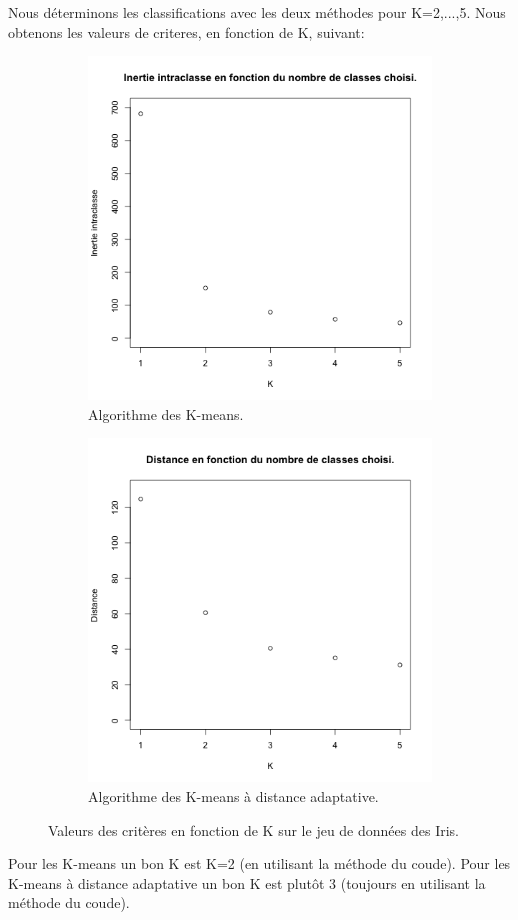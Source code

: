 \documentclass[a4paper,11pt,oneside,roman]{article}
\begin{document}
    Nous déterminons les classifications avec les deux méthodes pour K=2,...,5. 
    Nous obtenons les valeurs de criteres, en fonction de K, suivant:
    \begin{figure}
        \centering
        \begin{subfigure}{.5\textwidth}
          \centering
          \includegraphics[width=.8\linewidth]{imgs/K_means_Iris_critere.png}
          \caption{Algorithme des K-means.}
        \end{subfigure}%
        \begin{subfigure}{.5\textwidth}
          \centering
          \includegraphics[width=.8\linewidth]{imgs/K_means_adapt_Iris_critere.png}
          \caption{Algorithme des K-means à distance adaptative.}
        \end{subfigure}
        \caption{Valeurs des critères en fonction de K sur le jeu de données des Iris.}
        \label{fig_synth_3}
    \end{figure}

    Pour les K-means un bon K est K=2 (en utilisant la méthode du coude).
    Pour les K-means à distance adaptative un bon K est plutôt 3 (toujours en utilisant la méthode du coude).


    
\end{document}
